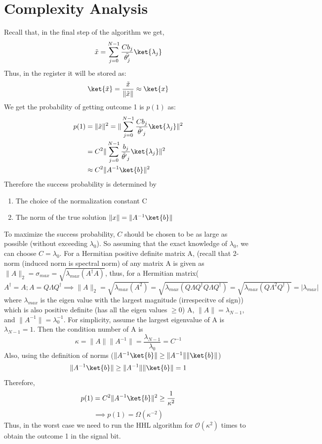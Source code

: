 \documentclass[12pt, oneside]{book}
\theoremstyle{definition}
\theoremstyle{definition}
\theoremstyle{remark}
\begin{document}
\section{Complexity Analysis}
Recall that, in the final step of the algorithm we get,
\[
\tilde{x}=\sum_{j=0}^{N-1} \frac{Cb_j}{\tilde{\theta'_j}}\ket{\lambda_j}
\]
Thus, in the register it will be stored as:
\[
\ket{\tilde{x}}=\frac{\tilde{x}}{\|\tilde{x}\|} \approx \ket{x}
\]
We get the probability of getting outcome 1 is $p(1)$ as:
\begin{align*}
p(1) &= \|\tilde{x}\|^2=\|\sum_{j=0}^{N-1}\frac{Cb_j}{\tilde{\theta'}_j}\ket{\lambda_j}\|^2\\
&=C^2\|\sum_{j=0}^{N-1}\frac{b_j}{\tilde{\theta'}_j}\ket{\lambda_j}\|^2\\
&\approx C^2\|A^{-1}\ket{b}\|^2
\end{align*}
Therefore the success probability is determined by
\begin{enumerate}
    \item The choice of the normalization constant C
    \item The norm of the true solution $\|x\|=\|A^{-1}\ket{b}\|$
\end{enumerate}
To maximize the success probability, $C$ should be chosen to be as large as possible (without exceeding $\lambda_0$). So assuming that the exact knowledge of $\lambda_0$, we can choose $C=\lambda_0$. For a Hermitian positive definite matrix A, (recall that 2-norm (induced norm is spectral norm) of any matrix A is given as $\|A\|_2=\sigma_{max}=\sqrt{\lambda_{max}(A^{\dagger}A)}$, thus, for a Hermitian matrix($A^{\dagger}=A; A=Q\Lambda Q^{\dagger} \implies \|A\|_2=\sqrt{\lambda_{max}(A^2)}= \sqrt{\lambda_{max}(Q\Lambda Q^{\dagger}Q\Lambda Q^{\dagger})}=\sqrt{\lambda_{max}(Q\Lambda^2Q^{\dagger})}=|\lambda_{max}|$ where $\lambda_{max}$ is the eigen value with the largest magnitude (irrespecitve of sign)) which is also positive definite (has all the eigen values $\geq 0$) A, $\|A\|=\lambda_{N-1}$, and $\|A^{-1}\|=\lambda^{-1}_0$. For simplicity, assume the largest eigenvalue of A is $\lambda_{N-1}=1$. Then the condition number of A is
\[
\kappa = \|A\|\|A^{-1}\|=\frac{\lambda_{N-1}}{\lambda_0}=C^{-1}
\]
Also, using the definition of norms ($\|A^{-1}\ket{b}\|\geq \|A^{-1}\|\|\ket{b}\|$)
\[
\|A^{-1}\ket{b}\|\geq \|A^{-1}\|\|\ket{b}\|=1
\]
Therefore, 
\[
p(1)=C^2\|A^{-1}\ket{b}\|^2\geq \frac{1}{\kappa^2}
\]
\[
\implies p(1)=\Omega(\kappa^{-2})
\]
Thus, in the worst case we need to run the HHL algorithm for $\mathcal{O}(\kappa^2)$ times to obtain the outcome 1 in the signal bit.
\end{document}

